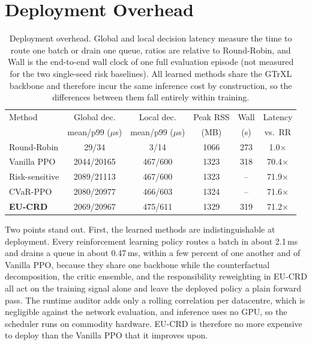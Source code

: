 
\section{Deployment Overhead}
\label{app:overhead}

\begin{table}[t]
\caption{Deployment overhead. Global and local decision latency measure the time to route one batch or drain one queue, ratios are relative to Round-Robin, and Wall is the end-to-end wall clock of one full evaluation episode (not measured for the two single-seed risk baselines). All learned methods share the GTrXL backbone and therefore incur the same inference cost by construction, so the differences between them fall entirely within training.}
\label{tab:overhead}
\centering
\small
\begin{tabular*}{\linewidth}{@{\extracolsep{\fill}}lccccc@{}}
\toprule
Method & Global dec. & Local dec. & Peak RSS & Wall & Latency \\
       & mean/p99 ($\mu$s) & mean/p99 ($\mu$s) & (MB) & (s) & vs.\ RR \\
\midrule
Round-Robin      & 29/34      & 3/14    & 1066 & 273 & 1.0$\times$ \\
Vanilla PPO      & 2044/20165 & 467/600 & 1323 & 318 & 70.4$\times$ \\
Risk-sensitive   & 2089/21113 & 467/600 & 1323 & --  & 71.9$\times$ \\
CVaR-PPO         & 2080/20977 & 466/603 & 1324 & --  & 71.6$\times$ \\
\textbf{EU-CRD}  & 2069/20967 & 475/611 & 1329 & 319 & 71.2$\times$ \\
\bottomrule
\end{tabular*}
\end{table}

Two points stand out. First, the learned methods are indistinguishable at deployment. Every reinforcement learning policy routes a batch in about 2.1\,ms and drains a queue in about 0.47\,ms, within a few percent of one another and of Vanilla PPO, because they share one backbone while the counterfactual decomposition, the critic ensemble, and the responsibility reweighting in EU-CRD all act on the training signal alone and leave the deployed policy a plain forward pass. The runtime auditor adds only a rolling correlation per datacentre, which is negligible against the network evaluation, and inference uses no GPU, so the scheduler runs on commodity hardware. EU-CRD is therefore no more expensive to deploy than the Vanilla PPO that it improves upon.

